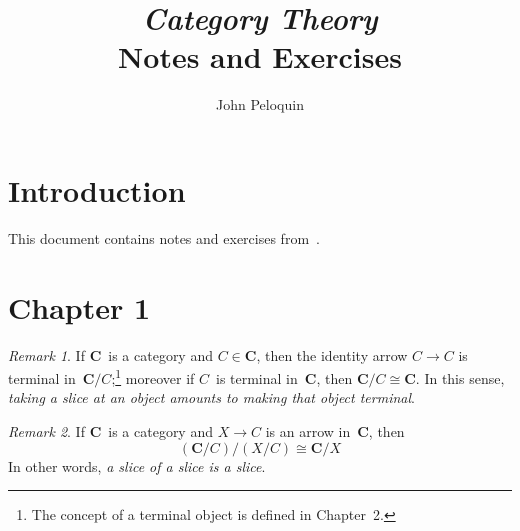 \documentclass[letterpaper,12pt]{article}
\title{\textit{Category Theory}\\Notes and Exercises}
\author{John Peloquin}
\date{}
\newcommand{\iso}{\cong}
\newcommand{\cat}[1]{\mathbf{#1}}
\newcommand{\2}{\cat{2}}
\newcommand{\C}{\cat{C}}
\theoremstyle{definition}
\theoremstyle{remark}
\newtheorem*{rmk}{Remark}
\theoremstyle{direction}
\begin{document}
\maketitle

\section*{Introduction}
This document contains notes and exercises from~\cite{awodey}.

\section*{Chapter 1}
\begin{rmk}
If \(\C\)~is a category and \(C\in\C\), then the identity arrow \(C\to C\) is terminal in~\(\C/C\);\footnote{The concept of a terminal object is defined in Chapter~2.} moreover if \(C\)~is terminal in~\(\C\), then \(\C/C\iso\C\). In this sense, \emph{taking a slice at an object amounts to making that object terminal}.
\end{rmk}

\begin{rmk}
If \(\C\)~is a category and \(X\to C\) is an arrow in~\(\C\), then
\[(\C/C)/(X/C)\iso\C/X\]
In other words, \emph{a slice of a slice is a slice}.
\end{rmk}
\end{document}
